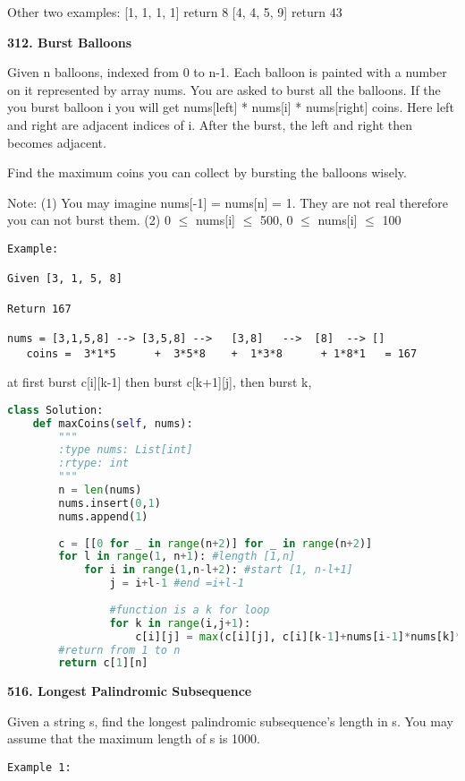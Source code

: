 \documentclass[../main.tex]{subfiles}
\begin{document}
\begin{examples}[resume]
Other two examples:
 [1, 1, 1, 1] return 8
 [4, 4, 5, 9] return 43

\item \textbf{312. Burst Balloons}

Given n balloons, indexed from 0 to n-1. Each balloon is painted with a number on it represented by array nums. You are asked to burst all the balloons. If the you burst balloon i you will get nums[left] * nums[i] * nums[right] coins. Here left and right are adjacent indices of i. After the burst, the left and right then becomes adjacent.

Find the maximum coins you can collect by bursting the balloons wisely.

Note: 
 (1) You may imagine nums[-1] = nums[n] = 1. They are not real therefore you can not burst them.
 (2) 0 $\leq$ nums[i] $\leq$  500, 0 $\leq$  nums[i] $\leq$  100
\begin{lstlisting}[numbers=none]
Example:

Given [3, 1, 5, 8]

Return 167

nums = [3,1,5,8] --> [3,5,8] -->   [3,8]   -->  [8]  --> []
   coins =  3*1*5      +  3*5*8    +  1*3*8      + 1*8*1   = 167
\end{lstlisting}

at first burst c[i][k-1] then burst c[k+1][j], then burst k,
\begin{lstlisting}[language = Python]
class Solution:
    def maxCoins(self, nums):
        """
        :type nums: List[int]
        :rtype: int
        """
        n = len(nums)
        nums.insert(0,1)
        nums.append(1)
        
        c = [[0 for _ in range(n+2)] for _ in range(n+2)]
        for l in range(1, n+1): #length [1,n]
            for i in range(1,n-l+2): #start [1, n-l+1]
                j = i+l-1 #end =i+l-1
                
                #function is a k for loop
                for k in range(i,j+1):
                    c[i][j] = max(c[i][j], c[i][k-1]+nums[i-1]*nums[k]*nums[j+1]+c[k+1][j])
        #return from 1 to n
        return c[1][n]
\end{lstlisting}

\item \textbf{516. Longest Palindromic Subsequence}

Given a string s, find the longest palindromic subsequence’s length in s. You may assume that the maximum length of s is 1000.
\begin{lstlisting}[numbers=none]
Example 1:


\end{lstlisting}
\end{examples}
\end{document}
